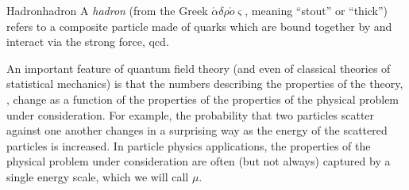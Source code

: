 \begin{exercise}
    \label{ex:gtoqq-amplitude}
\end{exercise}





\begin{definitionbox}{Hadron}{hadron}
    A \emph{\gls{hadron}} (from the Greek \(\acute{\alpha}\delta \rho \acute{o}\varsigma\), meaning ``stout'' or ``thick'') refers to a composite particle made of quarks which are bound together by and interact via the strong force, \gls{qcd}.
\end{definitionbox}


An important feature of quantum field theory (and even of classical theories of statistical mechanics) is that the numbers describing the properties of the theory, , change as a function of the properties of the properties of the physical problem under consideration.
%
For example, the probability that two particles scatter against one another changes in a surprising way as the energy of the scattered particles is increased.
%
In particle physics applications, the properties of the physical problem under consideration are often (but not always) captured by a single energy scale, which we will call \(\mu\).

